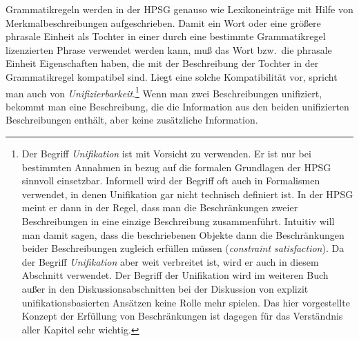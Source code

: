 \mbox{}%
Grammatikregeln werden in der HPSG genauso wie Lexikoneinträge mit Hilfe von Merkmalbeschreibungen
aufgeschrieben. %
Damit ein Wort oder eine größere phrasale Einheit als Tochter in einer durch eine bestimmte Grammatikregel lizenzierten Phrase
verwendet werden kann, muß das Wort bzw.\ die phrasale Einheit Eigenschaften haben, die mit
der Beschreibung der Tochter in der Grammatikregel kompatibel sind. Liegt eine solche Kompatibilität vor, spricht
man auch von \emph{Unifizierbarkeit}.\footnote{
  Der Begriff \emph{Unifikation} ist mit Vorsicht zu verwenden. Er ist nur bei bestimmten Annahmen
  in bezug auf die formalen Grundlagen der HPSG sinnvoll einsetzbar. Informell wird der Begriff oft
  auch in Formalismen verwendet, in denen Unifikation gar nicht technisch definiert ist. In der HPSG
  meint er dann in der Regel, dass man die Beschränkungen zweier Beschreibungen in eine einzige
  Beschreibung zusammenführt. Intuitiv will man damit sagen, dass die beschriebenen Objekte dann die
  Beschränkungen beider Beschreibungen zugleich erfüllen müssen (\emph{constraint satisfaction}). Da
  der Begriff \emph{Unifikation} aber weit verbreitet ist, wird er auch in diesem Abschnitt verwendet. Der Begriff der
  Unifikation wird im weiteren Buch außer in den Diskussionsabschnitten bei der Diskussion von explizit unifikationsbasierten
  Ansätzen keine Rolle mehr spielen. Das hier vorgestellte Konzept der
  Erfüllung von Beschränkungen ist dagegen für das Verständnis aller Kapitel sehr wichtig.%
}
Wenn man zwei Beschreibungen unifiziert, bekommt man
eine Beschreibung, die die Information aus den beiden unifizierten Beschreibungen enthält, aber
keine zusätzliche Information.

